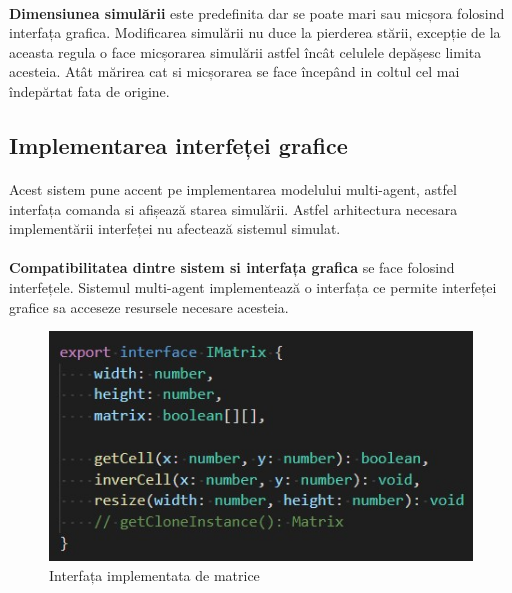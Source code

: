 \documentclass[11pt ,A4]{article}
\begin{document}
            \paragraph{}
                \textbf{Dimensiunea simulării} este predefinita dar se poate mari sau micșora folosind interfața grafica.
                Modificarea simulării nu duce la pierderea stării, excepție de la aceasta regula o face micșorarea simulării astfel încât celulele depășesc limita acesteia.
                Atât mărirea cat si micșorarea se face începând in coltul cel mai îndepărtat fata de origine.

        \subsection{Implementarea interfeței grafice}
            \paragraph{}
                Acest sistem pune accent pe implementarea modelului multi-agent, astfel interfața comanda si afișează starea simulării.
                Astfel arhitectura necesara implementării interfeței nu afectează sistemul simulat.

            \paragraph{}
                \textbf{Compatibilitatea dintre sistem si interfața grafica} se face folosind interfețele.
                Sistemul multi-agent implementează o interfața ce permite interfeței grafice sa acceseze resursele necesare acesteia.
                \begin{figure}[h]
                    \centering
                    \includegraphics[scale=0.8]{IMatrix_interface}
                    \caption{Interfața implementata de matrice}
                \end{figure}
\end{document}
